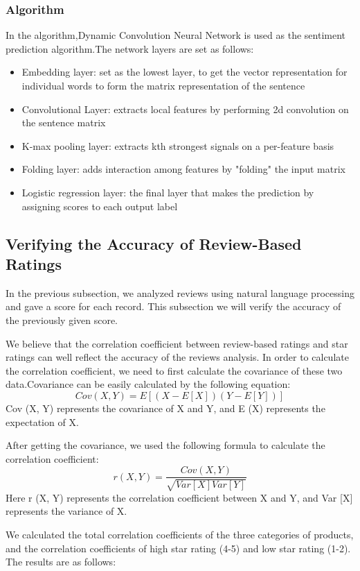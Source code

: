 \documentclass{mcmthesis}
\begin{document}
	\subsubsection{Algorithm}
	In the algorithm,Dynamic Convolution Neural Network is used as the sentiment prediction algorithm.The network layers are set as follows:
	\begin{itemize}
		\item Embedding layer: set as the lowest layer, to get the vector representation for individual words to form the matrix representation of the sentence
		\item Convolutional Layer: extracts local features by performing 2d convolution on the sentence matrix
		\item K-max pooling layer: extracts kth strongest signals on a per-feature basis
		\item Folding layer: adds interaction among features by "folding" the input matrix
		\item Logistic regression layer: the final layer that makes the prediction by assigning scores to each output label
	\end{itemize}
	
	
	\subsection{Verifying the Accuracy of Review-Based Ratings}
	In the previous subsection, we analyzed reviews using natural language processing and gave a score for each record. This subsection we will verify the accuracy of the previously given score.
	
	We believe that the correlation coefficient between review-based ratings and star ratings can well reflect the accuracy of the reviews analysis. In order to calculate the correlation coefficient, we need to first calculate the covariance of these two data.Covariance can be easily calculated by the following equation:
	$$Cov(X,Y)=E[(X-E[X])(Y-E[Y])]$$
	Cov (X, Y) represents the covariance of X and Y, and E (X) represents the expectation of X.
	
	After getting the covariance, we used the following formula to calculate the correlation coefficient:
	$$r(X,Y)=\frac{Cov(X,Y)}{\sqrt{Var[X]Var[Y]}}$$
	Here r (X, Y) represents the correlation coefficient between X and Y, and Var [X] represents the variance of X.
	
	We calculated the total correlation coefficients of the three categories of products, and the correlation coefficients of high star rating (4-5) and low star rating (1-2). The results are as follows:
	
\end{document}
